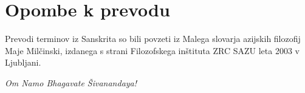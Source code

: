 
\vspace{5mm}



%
%        






\section*{Opombe k prevodu}
Prevodi terminov iz Sanskrita so bili povzeti iz Malega slovarja azijskih filozofij Maje Milčinski, izdanega s strani Filozofskega inštituta ZRC SAZU leta 2003 v Ljubljani.

\emph{Om Namo Bhagavate Šivanandaya!}





